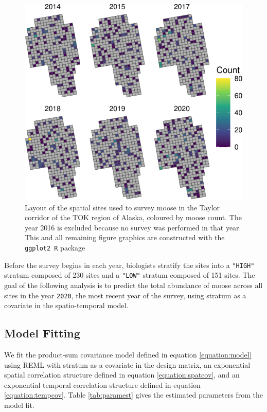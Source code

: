 \documentclass[]{interact}
\theoremstyle{plain}%
\theoremstyle{definition}
\theoremstyle{remark}
\begin{document}
\begin{figure}
\centering
\includegraphics{fpspatiotemp_manu_files/figure-latex/tokplotyears-1.pdf}
\caption{\label{fig:tokplotyears} Layout of the spatial sites used to
survey moose in the Taylor corridor of the TOK region of Alaska,
coloured by moose count. The year 2016 is excluded because no survey was
performed in that year. This and all remaining figure graphics are
constructed with the \texttt{ggplot2 R} package \citep{wickham2016data}}
\end{figure}

Before the survey begins in each year, biologists stratify the sites
into a \texttt{"HIGH"} stratum composed of 230 sites and a
\texttt{"LOW"} stratum composed of 151 sites. The goal of the following
analysis is to predict the total abundance of moose across all sites in
the year \texttt{2020}, the most recent year of the survey, using
stratum as a covariate in the spatio-temporal model.

\subsection{Model Fitting} \label{subsection:modelfit}

We fit the product-sum covariance model defined in equation
\ref{equation:model} using REML with stratum as a covariate in the
design matrix, an exponential spatial correlation structure defined in
equation \ref{equation:spatcov}, and an exponential temporal correlation
structure defined in equation \ref{equation:tempcov}. Table
\ref{tab:paramest} gives the estimated parameters from the model fit.
\end{document}
